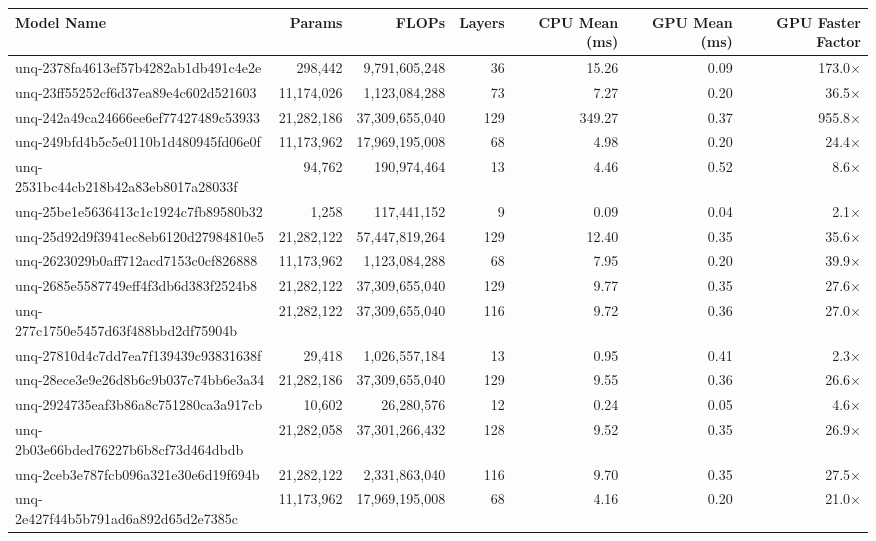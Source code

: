 \begin{table}[h!]
\centering
\fontsize{7}{9}\selectfont
\begin{tabular}{lrrrrrr}
\toprule
\textbf{Model Name} & \textbf{Params} & \textbf{FLOPs} & \textbf{Layers} & \textbf{CPU Mean (ms)} & \textbf{GPU Mean (ms)} & \textbf{GPU Faster Factor} \\
\midrule
unq-2378fa4613ef57b4282ab1db491c4e2e & 298,442 & 9,791,605,248 & 36 & 15.26 & 0.09 & 173.0$\times$ \\
unq-23ff55252cf6d37ea89e4c602d521603 & 11,174,026 & 1,123,084,288 & 73 & 7.27 & 0.20 & 36.5$\times$ \\
unq-242a49ca24666ee6ef77427489c53933 & 21,282,186 & 37,309,655,040 & 129 & 349.27 & 0.37 & 955.8$\times$ \\
unq-249bfd4b5c5e0110b1d480945fd06e0f & 11,173,962 & 17,969,195,008 & 68 & 4.98 & 0.20 & 24.4$\times$ \\
unq-2531bc44cb218b42a83eb8017a28033f & 94,762 & 190,974,464 & 13 & 4.46 & 0.52 & 8.6$\times$ \\
unq-25be1e5636413c1c1924c7fb89580b32 & 1,258 & 117,441,152 & 9 & 0.09 & 0.04 & 2.1$\times$ \\
unq-25d92d9f3941ec8eb6120d27984810e5 & 21,282,122 & 57,447,819,264 & 129 & 12.40 & 0.35 & 35.6$\times$ \\
unq-2623029b0aff712acd7153c0cf826888 & 11,173,962 & 1,123,084,288 & 68 & 7.95 & 0.20 & 39.9$\times$ \\
unq-2685e5587749eff4f3db6d383f2524b8 & 21,282,122 & 37,309,655,040 & 129 & 9.77 & 0.35 & 27.6$\times$ \\
unq-277c1750e5457d63f488bbd2df75904b & 21,282,122 & 37,309,655,040 & 116 & 9.72 & 0.36 & 27.0$\times$ \\
unq-27810d4c7dd7ea7f139439c93831638f & 29,418 & 1,026,557,184 & 13 & 0.95 & 0.41 & 2.3$\times$ \\
unq-28ece3e9e26d8b6c9b037c74bb6e3a34 & 21,282,186 & 37,309,655,040 & 129 & 9.55 & 0.36 & 26.6$\times$ \\
unq-2924735eaf3b86a8c751280ca3a917cb & 10,602 & 26,280,576 & 12 & 0.24 & 0.05 & 4.6$\times$ \\
unq-2b03e66bded76227b6b8cf73d464dbdb & 21,282,058 & 37,301,266,432 & 128 & 9.52 & 0.35 & 26.9$\times$ \\
unq-2ceb3e787fcb096a321e30e6d19f694b & 21,282,122 & 2,331,863,040 & 116 & 9.70 & 0.35 & 27.5$\times$ \\
unq-2e427f44b5b791ad6a892d65d2e7385c & 11,173,962 & 17,969,195,008 & 68 & 4.16 & 0.20 & 21.0$\times$ \\

\end{tabular}
\end{table}
